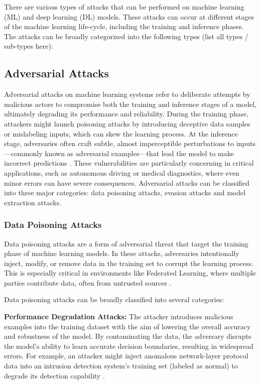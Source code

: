 \documentclass[conference]{IEEEtran}
\begin{document}
There are various types of attacks that can be performed on machine learning (ML) and deep learning (DL) models. These attacks can occur at different stages of the machine learning life-cycle, including the training and inference phases. The attacks can be broadly categorized into the following types (list all types / sub-types here):

\subsection{Adversarial Attacks}
Adversarial attacks on machine learning systems refer to deliberate attempts by malicious actors to compromise both the training and inference stages of a model, ultimately degrading its performance and reliability. During the training phase, attackers might launch poisoning attacks by introducing deceptive data samples or mislabeling inputs, which can skew the learning process. At the inference stage, adversaries often craft subtle, almost imperceptible perturbations to inputs—commonly known as adversarial examples—that lead the model to make incorrect predictions \cite{wu2021tolerating}. These vulnerabilities are particularly concerning in critical applications, such as autonomous driving or medical diagnostics, where even minor errors can have severe consequences. Adversarial attacks can be classified into three major categories: data poisoning attacks, evasion attacks and model extraction attacks.

\subsubsection{Data Poisoning Attacks}
Data poisoning attacks are a form of adversarial threat that target the training phase of machine learning models. In these attacks, adversaries intentionally inject, modify, or remove data in the training set to corrupt the learning process. This is especially critical in environments like Federated Learning, where multiple parties contribute data, often from untrusted sources \cite{sun2021data}.

Data poisoning attacks can be broadly classified into several categories:

\textbf{Performance Degradation Attacks:}
The attacker introduces malicious examples into the training dataset with the aim of lowering the overall accuracy and robustness of the model. By contaminating the data, the adversary disrupts the model’s ability to learn accurate decision boundaries, resulting in widespread errors. For example, an attacker might inject anomalous network-layer protocol data into an intrusion detection system’s training set (labeled as normal) to degrade its detection capability \cite{pitropakis2019taxonomy}.
\end{document}
